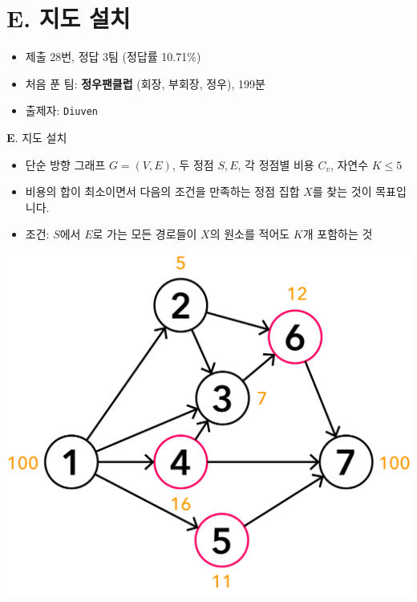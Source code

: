 \section{E. 지도 설치}

\begin{frame} %
    \begin{itemize}
        \item 제출 28번, 정답 3팀 (정답률 10.71\%)
        \item 처음 푼 팀: \textbf{정우팬클럽} (회장, 부회장, 정우), 199분
        \item 출제자: \texttt{Diuven}
    \end{itemize}
\end{frame}

\begin{frame}{\textbf{E}. 지도 설치}

    \begin{itemize}
        \item 단순 방향 그래프 $G = (V, E)$, 두 정점 $S, E$, 각 정점별 비용 $C_v$, 자연수 $K \leq 5$
        \item 비용의 합이 최소이면서 다음의 조건을 만족하는 정점 집합 $X$를 찾는 것이 목표입니다.
        \item 조건: $S$에서 $E$로 가는 모든 경로들이 $X$의 원소를 적어도 $K$개 포함하는 것
    \end{itemize}
    
    \begin{center}
        \includegraphics[width=0.3\linewidth]{../images/setting-maps/maps_ex_1.png}
    \end{center}
    
\end{frame}


